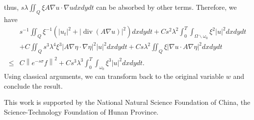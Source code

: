 \documentclass[9pt,reqno]{amsart}
\theoremstyle{plain}
\numberwithin{equation}{section}
\numberwithin{theorem}{section}
\def\Om{\Omega}
\DeclareMathOperator*{\Div}{\mathrm{div}}
\def\Om{\Omega}
\begin{document}
	thus, $s \lambda \iint_Q \xi A \nabla u \cdot \nabla udx dy dt$ can be absorbed by other terms. Therefore, we have
	\begin{equation}\label{LU5}
		\begin{split}
			&s^{-1}\iint_{Q} \xi^{-1} (|u_t |^2 + \left|\Div(A\nabla u)\right|^2) dx dydt +C s^2 \lambda^2 \int_0^T \int_{\Om\backslash \omega_0} \xi^{2}|u|^2dx dy d t\\
			&+C\iint_Q s^3 \lambda^4 \xi^3\left|A \nabla \eta \cdot \nabla \eta \right|^2|u|^2 dx dydt  + C s  \lambda^2 \iint_Q\xi|\nabla u \cdot A \nabla \eta|^2 dx dy d t\\
			\leq& C\left\|e^{-s \sigma} f\right\|^2
			+Cs^3 \lambda^3 \int_0^T \int_{\omega_0} \xi^3|u|^2dx dy d t.
		\end{split}
	\end{equation}
	Using classical arguments, we can transform back to the original variable $w$ and conclude the result.
	
	
	
	\vspace{3mm}
	
	
	\vspace{2mm}
	
	This work is supported by the National Natural Science Foundation of China, the Science-Technology Foundation of Hunan Province.
	
	
	
	
	
	
	
	
\end{document}
